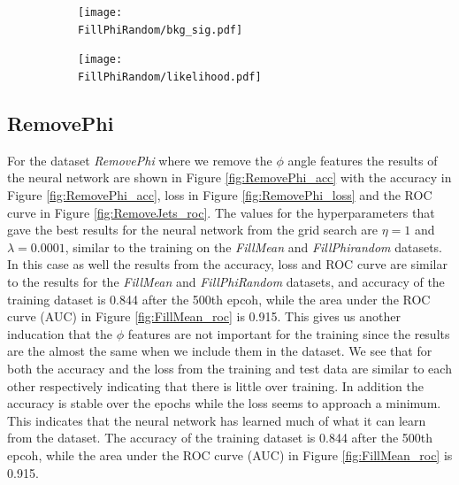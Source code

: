 \documentclass[../../main/main.tex]{subfiles}
\begin{document}
\begin{figure}[H]
  \centering
  \begin{subfigure}[t]{0.5\textwidth}
    \centering
    \texttt{[image: \\FillPhiRandom/bkg\_sig.pdf]}
    \caption{\captionBkgSig}    
    \label{fig:FillPhiRandom_bkg_sig}
  \end{subfigure}
  \vspace{0.01cm}
  \begin{subfigure}[t]{0.5\textwidth}
    \centering
    \texttt{[image: \\FillPhiRandom/likelihood.pdf]}
    \caption{\captionLik}    
    \label{fig:FillPhiRandom_likelihood}
  \end{subfigure}
  \caption{}
  \label{fig:FillPhiRandom_Z}
\end{figure}


\subsection{RemovePhi}
\label{sec:removephi}

For the dataset \emph{RemovePhi} where we remove the \(\phi\) angle features the results of the neural network are shown in Figure \ref{fig:RemovePhi_acc} with the accuracy in Figure \ref{fig:RemovePhi_acc}, loss in Figure \ref{fig:RemovePhi_loss} and the ROC curve in Figure \ref{fig:RemoveJets_roc}. The values for the hyperparameters that gave the best results for the neural network from the grid search are \(\eta=1\) and \(\lambda=0.0001\), similar to the training on the \emph{FillMean} and \emph{FillPhirandom} datasets. In this case as well the results from the accuracy, loss and ROC curve are similar to the results for the \emph{FillMean} and \emph{FillPhiRandom} datasets, and accuracy of the training dataset is 0.844 after the 500th epcoh, while the area under the ROC curve (AUC) in Figure \ref{fig:FillMean_roc} is 0.915. This gives us another inducation that the \(\phi\) features are not important for the training since the results are the almost the same when we include them in the dataset.  We see that for both the accuracy and the loss from the training and test data are similar to each other respectively indicating that there is little over training. In addition the accuracy is stable over the epochs while the loss seems to approach a minimum. This indicates that the neural network has learned much of what it can learn from the dataset. The accuracy of the training dataset is 0.844 after the 500th epcoh, while the area under the ROC curve (AUC) in Figure \ref{fig:FillMean_roc} is 0.915.
\end{document}
